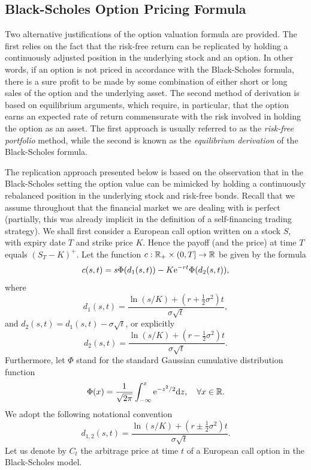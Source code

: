 \subsection{Black-Scholes Option Pricing Formula}
Two alternative justifications of the option valuation formula are provided. The first relies on the fact that the risk-free return can be replicated by holding a continuously adjusted position in the underlying stock and an option. In other words, if an option is not priced in accordance with the Black-Scholes formula, there is a sure profit to be made by some combination of either short or long sales of the option and the underlying asset. The second method of derivation is based on equilibrium arguments, which require, in particular, that the option earns an expected rate of return commensurate with the risk involved in holding the option as an asset. The first approach is usually referred to as the \textit{risk-free portfolio} method, while the second is known as the \textit{equilibrium derivation} of the Black-Scholes formula.

The replication approach presented below is based on the observation that in the Black-Scholes setting the option value can be mimicked by holding a continuously rebalanced position in the underlying stock and risk-free bonds. Recall that we assume throughout that the financial market we are dealing with is perfect (partially, this was already implicit in the definition of a self-financing trading strategy).
We shall first consider a European call option written on a stock \(S\), with expiry date \(T\) and strike price \(K\). Hence the payoff (and the price) at time \(T\) equals \((S_T - K)^+\). Let the function \(c : \mathbb{R}_+ \times \left(0, T\right] \to \mathbb{R}\) be given by the formula
\begin{equation}
	c(s, t) = s \Phi(d_1(s, t)) - K \mathrm{e}^{-rt} \Phi(d_2(s, t)),
	\label{eq:CallPrice}
\end{equation}
where
\begin{equation}
	d_1(s, t) = \frac{\ln(s/K) + (r + \frac{1}{2}\sigma^2)t}{\sigma \sqrt{t}},
	\label{eq:D1Definition}
\end{equation}
and \(d_2(s, t) = d_1(s, t) - \sigma \sqrt{t}\), or explicitly
\begin{equation}
	d_2(s, t) = \frac{\ln(s/K) + (r - \frac{1}{2}\sigma^2)t}{\sigma \sqrt{t}}.
	\label{eq:D2Definition}
\end{equation}
Furthermore, let \(\Phi\) stand for the standard Gaussian cumulative distribution function
\begin{equation*}
	\Phi(x) = \frac{1}{\sqrt{2\pi}} \int_{-\infty}^x \mathrm{e}^{-z^2/2} \mathrm{d} z, \quad \forall x \in \mathbb{R}.
\end{equation*}
We adopt the following notational convention
\begin{equation*}
	d_{1,2}(s, t) = \frac{\ln(s/K) + (r \pm \frac{1}{2}\sigma^2)t}{\sigma \sqrt{t}}.
\end{equation*}
Let us denote by \(C_t\) the arbitrage price at time \(t\) of a European call option in the Black-Scholes model.

